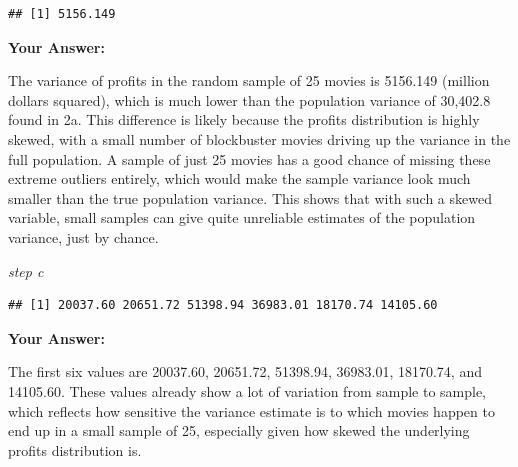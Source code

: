 \documentclass[
]{article}
\newenvironment{Shaded}{\begin{snugshade}}{\end{snugshade}}
\newcommand{\AttributeTok}[1]{\textcolor[rgb]{0.13,0.29,0.53}{#1}}
\newcommand{\ConstantTok}[1]{\textcolor[rgb]{0.56,0.35,0.01}{#1}}
\newcommand{\ControlFlowTok}[1]{\textcolor[rgb]{0.13,0.29,0.53}{\textbf{#1}}}
\newcommand{\DecValTok}[1]{\textcolor[rgb]{0.00,0.00,0.81}{#1}}
\newcommand{\FunctionTok}[1]{\textcolor[rgb]{0.13,0.29,0.53}{\textbf{#1}}}
\newcommand{\NormalTok}[1]{#1}
\newcommand{\OtherTok}[1]{\textcolor[rgb]{0.56,0.35,0.01}{#1}}
\newcommand{\SpecialCharTok}[1]{\textcolor[rgb]{0.81,0.36,0.00}{\textbf{#1}}}
\begin{document}
\begin{verbatim}
## [1] 5156.149
\end{verbatim}

\textbf{Your Answer:}

The variance of profits in the random sample of 25 movies is 5156.149
(million dollars squared), which is much lower than the population
variance of 30,402.8 found in 2a. This difference is likely because the
profits distribution is highly skewed, with a small number of
blockbuster movies driving up the variance in the full population. A
sample of just 25 movies has a good chance of missing these extreme
outliers entirely, which would make the sample variance look much
smaller than the true population variance. This shows that with such a
skewed variable, small samples can give quite unreliable estimates of
the population variance, just by chance.

\emph{step c}

\begin{Shaded}
\end{Shaded}

\begin{verbatim}
## [1] 20037.60 20651.72 51398.94 36983.01 18170.74 14105.60
\end{verbatim}

\textbf{Your Answer:}

The first six values are 20037.60, 20651.72, 51398.94, 36983.01,
18170.74, and 14105.60. These values already show a lot of variation
from sample to sample, which reflects how sensitive the variance
estimate is to which movies happen to end up in a small sample of 25,
especially given how skewed the underlying profits distribution is.
\end{document}
